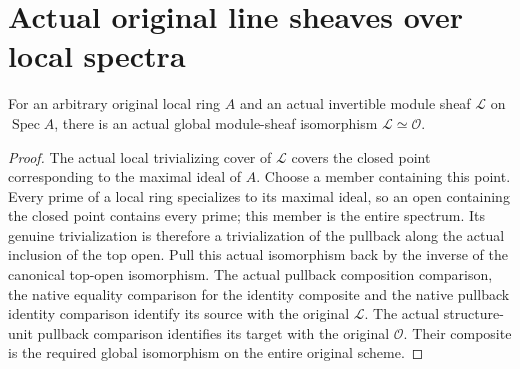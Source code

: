 \section{Actual original line sheaves over local spectra}

\begin{lemma}
\label{lem:actual-local-spectrum-line-triviality}
\leanok
For an arbitrary original local ring $A$ and an actual invertible
module sheaf $\mathcal L$ on $\operatorname{Spec}A$, there is an actual
global module-sheaf isomorphism $\mathcal L\simeq\mathcal O$.
\end{lemma}
\begin{proof}
The actual local trivializing cover of $\mathcal L$ covers the closed
point corresponding to the maximal ideal of $A$. Choose a member
containing this point. Every prime of a local ring specializes to its
maximal ideal, so an open containing the closed point contains every
prime; this member is the entire spectrum. Its genuine trivialization
is therefore a trivialization of the pullback along the actual
inclusion of the top open. Pull this actual isomorphism back by the
inverse of the canonical top-open isomorphism. The actual pullback
composition comparison, the native equality comparison for the
identity composite and the native pullback identity comparison
identify its source with the original $\mathcal L$. The actual
structure-unit pullback comparison identifies its target with the
original $\mathcal O$. Their composite is the required global
isomorphism on the entire original scheme.
\end{proof}
